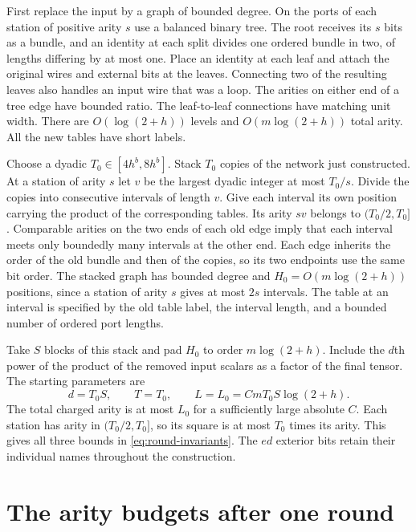 First replace the input by a graph of bounded degree. On the ports of
each station of positive arity $s$ use a balanced binary tree. The root
receives its $s$ bits as a bundle, and an identity at each split divides
one ordered bundle in two, of lengths differing by at most one. Place
an identity at each leaf and attach the original wires and external bits
at the leaves. Connecting two of the resulting leaves also handles an input
wire that was a loop. The arities on either end of a tree edge have bounded
ratio. The leaf-to-leaf connections have matching unit width. There are
$O(\log(2+h))$ levels and $O(m\log(2+h))$ total arity. All the new
tables have short labels.

Choose a dyadic $T_0\in[4h^b,8h^b]$. Stack $T_0$ copies of the network
just constructed. At a station of arity $s$ let $v$ be the largest dyadic
integer at most $T_0/s$. Divide the copies into consecutive intervals of
length $v$. Give each interval its own position carrying the product of
the corresponding tables. Its arity $sv$ belongs to $(T_0/2,T_0]$.
Comparable arities on the two ends of each old edge imply that each
interval meets only boundedly many intervals at the other end. Each edge inherits the order of the old bundle and then of the copies,
so its two endpoints use the same bit order. The stacked graph has
bounded degree and $H_0=O(m\log(2+h))$ positions, since a station of
arity $s$ gives at most $2s$ intervals. The table at an interval is
specified by the old table label, the interval length, and a bounded
number of ordered port lengths.

Take $S$ blocks of this stack and pad $H_0$ to order $m\log(2+h)$.
Include the $d$th power of the product of the removed input scalars as
a factor of the final tensor. The starting parameters are
\begin{equation}\label{eq:round-start}
 d=T_0S,\qquad T=T_0,\qquad L=L_0=CmT_0S\log(2+h).
\end{equation}
The total charged arity is at most $L_0$ for a sufficiently large
absolute $C$. Each station has arity in $(T_0/2,T_0]$, so its square
is at most $T_0$ times its arity. This gives all three bounds in
\eqref{eq:round-invariants}. The $ed$ exterior bits retain their
individual names throughout the construction.



\section{The arity budgets after one round}\label{sec:full}

